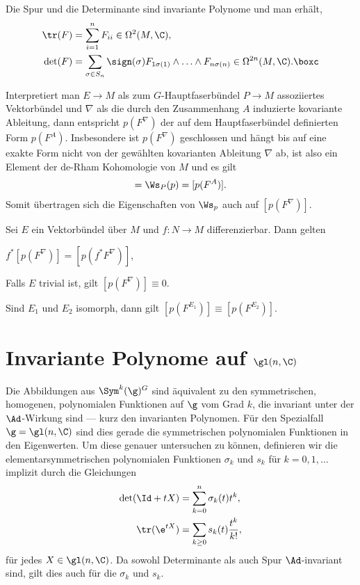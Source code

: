 \documentclass[%
	paper=a5,%
	fleqn,%
	DIV=18,%
	BCOR=0mm,
	fontsize=11pt,
	titlepage=false,%
	bibliography=totoc,
	DIV=18,%
	twoside=true,
	pdftitle=Riemannsche Geometrie,
	pdfauthor=Uwe Semmelmann,
	numbers=noendperiod]%
	{scrbook}
\begin{document}
\begin{ex}
Die Spur und die Determinante sind invariante Polynome und man erhält,
\begin{align*}
\tr(F) &= \sum_{i=1}^n F_{ii} \in \Omega^2(M,\C),\\
\det(F) &= \sum_{\sigma\in S_n} \sign(\sigma) F_{1\sigma(1)}\wedge \ldots
\wedge F_{n\sigma(n)} \in \Omega^{2n}(M,\C).\boxc
\end{align*} 
\end{ex}


Interpretiert man $E\to M$ als zum
$G$-Hauptfaserbündel $P\to M$  assoziiertes Vektorbündel und $\nabla$ als die
durch den Zusammenhang $A$ induzierte kovariante Ableitung, dann entspricht  $p(F^\nabla)$ der auf dem Hauptfaserbündel definierten
Form $p(F^A)$. Insbesondere ist $p(F^\nabla)$ geschlossen und hängt bis auf
eine exakte Form nicht von der gewählten kovarianten Ableitung $\nabla$ ab, ist also ein Element
der de-Rham Kohomologie von $M$ und es gilt
\begin{align*}
[p(F^\nabla)] = \Ws_P(p) = [p(F^A)].
\end{align*}
Somit übertragen sich die Eigenschaften von $\Ws_p$ auch auf $[p(F^\nabla)]$.

\begin{lem}
Sei $E$ ein Vektorbündel über $M$ und $f\colon N\to M$ differenzierbar. Dann gelten
\begin{propenum}
\item $f^*[p(F^\nabla)] = [p(f^*F^\nabla)]$,
\item Falls $E$ trivial ist, gilt $[p(F^\nabla)]\equiv 0$.
\item Sind $E_1$ und $E_2$ isomorph, dann gilt $[p(F^{E_1})] \equiv
[p(F^{E_2})]$.\fish
\end{propenum}
\end{lem}

\section{Invariante Polynome auf $\gl(n,\C)$}

Die Abbildungen aus $\Sym^k(\g)^G$ sind äquivalent zu den symmetrischen,
homogenen, polynomialen Funktionen auf $\g$ vom Grad $k$, die invariant unter
der $\Ad$-Wirkung sind --- kurz den invarianten Polynomen. Für den Spezialfall
$\g=\gl(n,\C)$ sind dies gerade die symmetrischen polynomialen
Funktionen in den Eigenwerten. Um diese genauer untersuchen zu können,
definieren wir die elementarsymmetrischen polynomialen Funktionen $\sigma_k$
und $s_k$ für $k=0,1,\ldots$ implizit durch die Gleichungen
\begin{align*}
\det(\Id + tX) &= \sum_{k=0}^n \sigma_k(t) t^k,\\
\tr(\e^{tX}) &= \sum_{k\ge 0} s_k(t)\frac{t^k}{k!},
\end{align*}
für jedes $X\in \gl(n,\C)$. Da sowohl Determinante als auch Spur $\Ad$-invariant
sind, gilt dies auch für die $\sigma_k$ und $s_k$.
\end{document}
